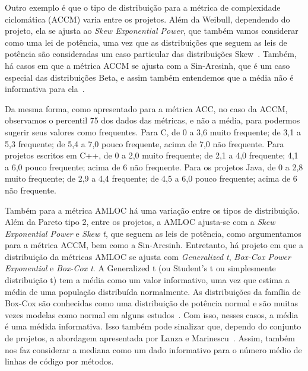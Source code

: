 \documentclass{llncs}
\begin{document}
Outro exemplo é que o tipo de distribuição para a métrica de complexidade
ciclomática (ACCM) varia entre os projetos.
%
Além da Weibull, dependendo do projeto, ela se ajusta ao \textit{Skew
Exponential Power}, que também vamos considerar como uma lei de potência, uma
vez que as distribuições que seguem as leis de potência são consideradas um
caso particular das distribuições Skew~\cite{Mahnke2012}.
%
Também, há casos em que a métrica ACCM se ajusta com a Sin-Arcsinh, que é um
caso especial das distribuições Beta, e assim também entendemos que a média não
é informativa para ela~\cite{jones2005}.

Da mesma forma, como apresentado para a métrica ACC, no caso da ACCM,
observamos o percentil 75 dos dados das métricas, e não a média, para podermos
sugerir seus valores como frequentes.
%
Para C, de 0 a 3,6 muito frequente; de 3,1 a 5,3 frequente; de 5,4 a 7,0 pouco
frequente, acima de 7,0 não frequente.  Para projetos escritos em C++, de 0 a
2,0 muito frequente; de 2,1 a 4,0 frequente; 4,1 a 6,0 pouco frequente; acima
de 6 não frequente.
%
Para os projetos Java, de 0 a 2,8 muito frequente; de 2,9 a 4,4 frequente; de
4,5 a 6,0 pouco frequente; acima de 6 não frequente.

Também para a métrica AMLOC há uma variação entre os tipos de distribuição.
Além da Pareto tipo 2, entre os projetos, a AMLOC ajusta-se com a \textit{Skew
Exponential Power} e \textit{Skew t}, que seguem as leis de potência, como
argumentamos para a métrica ACCM, bem como a Sin-Arcsinh.
%
Entretanto, há projeto em que a distribuição da métricas AMLOC se ajusta com
\textit{Generalized t}, \textit{Box-Cox Power Exponential} e \textit{Box-Cox
t}.
%
A Generalized t (ou Student's t ou simplesmente distribuição t) tem a média
como um valor informativo, uma vez que estima a média de uma população
distribuída normalmente.
%
As distribuições da família de Box-Cox são conhecidas como uma distribuição de
potência normal e são muitas vezes modelas como normal em alguns
estudos~\cite{Rigby2006}.
%
Com isso, nesses casos, a média é uma médida informativa. Isso também pode
sinalizar que, dependo do conjunto de projetos, a abordagem apresentada por
Lanza e Marinescu~\cite{Lanza2006}.
%
Assim, também nos faz considerar a mediana como um dado informativo para o
número médio de linhas de código por métodos.
\end{document}

